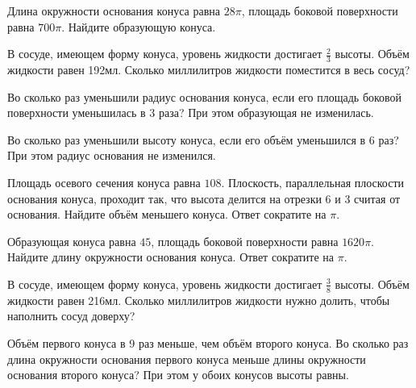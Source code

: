 \documentclass[a4paper]{article}
\begin{document}
\begin{taskBN}{46}
Длина окружности основания конуса равна $28\pi$, площадь боковой поверхности равна $700\pi$. Найдите образующую конуса. 
\end{taskBN}

\begin{taskBN}{47}
В сосуде, имеющем форму конуса, уровень жидкости достигает $\frac{2}{3}$ высоты. Объём жидкости равен 192мл. Сколько миллилитров жидкости поместится в весь сосуд?
\end{taskBN}

\begin{taskBN}{48}
Во сколько раз уменьшили радиус основания конуса, если его площадь боковой поверхности уменьшилась в 3 раза? При этом образующая не изменилась.
\end{taskBN}

\begin{taskBN}{49}
Во сколько раз уменьшили высоту конуса, если его объём уменьшился в 6 раз? При этом радиус основания не изменился.
\end{taskBN}

\begin{taskBN}{50}
Площадь осевого сечения конуса равна $108$. Плоскость, параллельная плоскости основания конуса,  проходит так, что высота делится на отрезки $6$ и $3$ считая от основания. Найдите объём меньшего конуса. Ответ сократите на $\pi$.
\end{taskBN}

\begin{taskBN}{51}
Образующая конуса равна $45$, площадь боковой поверхности равна $1620\pi$. Найдите длину окружности основания конуса. Ответ сократите на $\pi$.
\end{taskBN}

\begin{taskBN}{52}
В сосуде, имеющем форму конуса, уровень жидкости достигает $\frac{3}{8}$ высоты. Объём жидкости равен 216мл. Сколько миллилитров жидкости нужно долить, чтобы наполнить сосуд доверху?
\end{taskBN}

\begin{taskBN}{53}
Объём первого конуса в 9 раз меньше, чем объём второго конуса. Во сколько раз длина окружности основания первого конуса меньше длины окружности основания второго конуса? При этом у обоих конусов высоты равны.
\end{taskBN}
\end{document}
